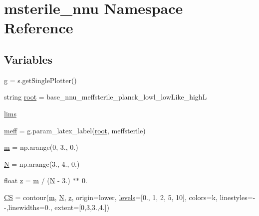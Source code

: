 \hypertarget{namespacemsterile__nnu}{}\section{msterile\+\_\+nnu Namespace Reference}
\label{namespacemsterile__nnu}
\subsection*{Variables}
\begin{DoxyCompactItemize}
\item 
\mbox{\hyperlink{namespacemsterile__nnu_a8154ecd4391c509729b7695f0ec04240}{g}} = s.\+get\+Single\+Plotter()
\item 
string \mbox{\hyperlink{namespacemsterile__nnu_ae2775650ce2fe7c5079b343fa1cdd27f}{root}} = \textquotesingle{}base\+\_\+nnu\+\_\+meffsterile\+\_\+planck\+\_\+lowl\+\_\+low\+Like\+\_\+highL\textquotesingle{}
\item 
\mbox{\hyperlink{namespacemsterile__nnu_acb894b369697b5d2d2ecb41b3f76e5e6}{lims}}
\item 
\mbox{\hyperlink{namespacemsterile__nnu_aafcd5674c2222360e61122b069999594}{meff}} = g.\+param\+\_\+latex\+\_\+label(\mbox{\hyperlink{namespacemsterile__nnu_ae2775650ce2fe7c5079b343fa1cdd27f}{root}}, \textquotesingle{}meffsterile\textquotesingle{})
\item 
\mbox{\hyperlink{namespacemsterile__nnu_ad49be68bece85f98028b3cc37ad2bf49}{m}} = np.\+arange(0, 3., 0.)
\item 
\mbox{\hyperlink{namespacemsterile__nnu_aa464b65176d2a7b327a61d2e1f1cf531}{N}} = np.\+arange(3., 4., 0.)
\item 
float \mbox{\hyperlink{namespacemsterile__nnu_a469ed5d6fc06710bc58b11f46a4639bd}{z}} = \mbox{\hyperlink{namespacemsterile__nnu_ad49be68bece85f98028b3cc37ad2bf49}{m}} / (\mbox{\hyperlink{namespacemsterile__nnu_aa464b65176d2a7b327a61d2e1f1cf531}{N}} -\/ 3.) $\ast$$\ast$ 0.
\item 
\mbox{\hyperlink{namespacemsterile__nnu_aa03517f00d798f1f63f542ce668e0bea}{CS}} = contour(\mbox{\hyperlink{namespacemsterile__nnu_ad49be68bece85f98028b3cc37ad2bf49}{m}}, \mbox{\hyperlink{namespacemsterile__nnu_aa464b65176d2a7b327a61d2e1f1cf531}{N}}, \mbox{\hyperlink{namespacemsterile__nnu_a469ed5d6fc06710bc58b11f46a4639bd}{z}}, origin=\textquotesingle{}lower\textquotesingle{}, \mbox{\hyperlink{namespacemsterile__nnu_a2313686e4fae8295172c1c4f1c520367}{levels}}=\mbox{[}0., 1, 2, 5, 10\mbox{]}, colors=\textquotesingle{}k\textquotesingle{}, linestyles=\textquotesingle{}-\/-\/\textquotesingle{},linewidths=0., extent=\mbox{[}0,3,3.,4.\mbox{]})
$$
\end{DoxyCompactItemize}
